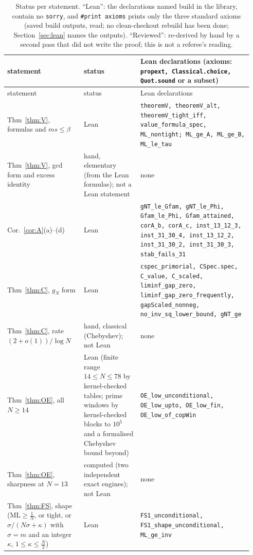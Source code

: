 \documentclass[11pt]{article}
\theoremstyle{definition}
\theoremstyle{remark}
\newcommand{\ML}{\mathrm{ML}}
\begin{document}
{\footnotesize
\setlength{\tabcolsep}{4pt}
\begin{longtable}{@{}p{}p{}p{}@{}}
\caption{Status per statement. ``Lean'': the declarations named build in the library, contain no \texttt{sorry}, and \texttt{\#print axioms} prints only the three standard axioms (saved build outputs, read; no clean-checkout rebuild has been done; Section~\ref{sec:lean} names the outputs). ``Reviewed'': re-derived by hand by a second pass that did not write the proof; this is not a referee's reading.}\label{tab:status}\\
\toprule
statement & status & Lean declarations (axioms: \texttt{propext, Classical.choice, Quot.sound} or a subset) \\
\midrule
\endfirsthead
\toprule
statement & status & Lean declarations \\
\midrule
\endhead
\bottomrule
\endfoot
Thm~\ref{thm:V}, formulas and $ms\le\beta$ & Lean & \texttt{theoremV, theoremV\_alt, theoremV\_tight\_iff, value\_formula\_spec, ML\_nontight; ML\_ge\_A, ML\_ge\_B, ML\_le\_tau} \\
Thm~\ref{thm:V}, gcd form and excess identity & hand, elementary (from the Lean formulas); not a Lean statement & none \\
Cor.~\ref{cor:A}(a)--(d) & Lean & \texttt{gNT\_le\_Gfam, gNT\_le\_Phi, Gfam\_le\_Phi, Gfam\_attained, corA\_b, corA\_c, inst\_13\_12\_3, inst\_31\_30\_4, inst\_13\_12\_2, inst\_31\_30\_2, inst\_31\_30\_3, stab\_fails\_31} \\
Thm~\ref{thm:C}, $g_N$ form & Lean & \texttt{cspec\_primorial, CSpec.spec, C\_value, C\_scaled, liminf\_gap\_zero, liminf\_gap\_zero\_frequently, gapScaled\_nonneg, no\_inv\_sq\_lower\_bound, gNT\_ge} \\
Thm~\ref{thm:C}, rate $(2+o(1))/\log N$ & hand, classical (Chebyshev); not Lean & none \\
Thm~\ref{thm:OE}, all $N\ge14$ & Lean (finite range $14\le N\le78$ by kernel-checked tables; prime windows by kernel-checked blocks to $10^5$ and a formalised Chebyshev bound beyond) & \texttt{OE\_low\_unconditional, OE\_low\_upto, OE\_low\_fin, OE\_low\_of\_copWin} \\
Thm~\ref{thm:OE}, sharpness at $N=13$ & computed (two independent exact engines); not Lean & none \\
Thm~\ref{thm:FS}, shape ($\ML\ge\frac1N$, or tight, or $\sigma/(N\sigma+\kappa)$ with $\sigma=m$ and an integer $\kappa$, $1\le\kappa\le\frac N2$) & Lean & \texttt{FS1\_unconditional, FS1\_shape\_unconditional, ML\_ge\_inv} \\

\end{longtable}}
\end{document}
